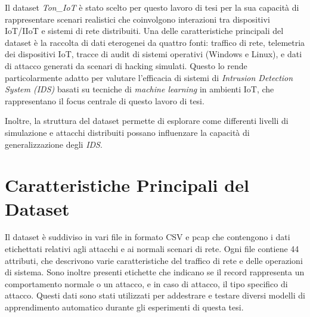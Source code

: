 Il dataset \textit{Ton\_IoT} è stato scelto per questo lavoro di tesi per la sua capacità di rappresentare scenari realistici che coinvolgono interazioni tra dispositivi IoT/IIoT e sistemi di rete distribuiti. Una delle caratteristiche principali del dataset è la raccolta di dati eterogenei da quattro fonti: traffico di rete, telemetria dei dispositivi IoT, tracce di audit di sistemi operativi (Windows e Linux), e dati di attacco generati da scenari di hacking simulati. Questo lo rende particolarmente adatto per valutare l'efficacia di sistemi di \textit{Intrusion Detection System (IDS)} basati su tecniche di \textit{machine learning} in ambienti IoT, che rappresentano il focus centrale di questo lavoro di tesi.

Inoltre, la struttura del dataset permette di esplorare come differenti livelli di simulazione e attacchi distribuiti possano influenzare la capacità di generalizzazione degli \textit{IDS}.

\section{Caratteristiche Principali del Dataset}

Il dataset è suddiviso in vari file in formato CSV e pcap che contengono i dati etichettati relativi agli attacchi e ai normali scenari di rete. Ogni file contiene 44 attributi, che descrivono varie caratteristiche del traffico di rete e delle operazioni di sistema. Sono inoltre presenti etichette che indicano se il record rappresenta un comportamento normale o un attacco, e in caso di attacco, il tipo specifico di attacco. Questi dati sono stati utilizzati per addestrare e testare diversi modelli di apprendimento automatico durante gli esperimenti di questa tesi.

